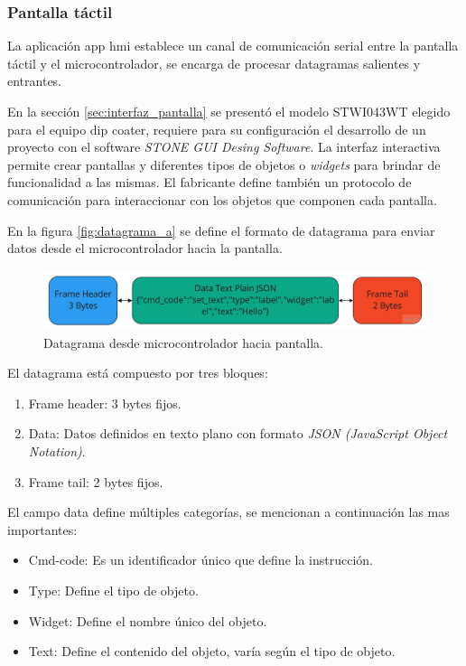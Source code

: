 \subsubsection{Pantalla táctil}

La aplicación app hmi establece un canal de comunicación serial entre la pantalla táctil y el microcontrolador, se encarga de procesar datagramas salientes y entrantes. 

En la sección \ref{sec:interfaz_pantalla} se presentó el modelo STWI043WT elegido para el equipo dip coater, requiere para su configuración el desarrollo de un proyecto con el software \textit{STONE GUI Desing Software}. La interfaz interactiva permite crear pantallas y diferentes tipos de objetos o \textit{widgets} para brindar de funcionalidad a las mismas. El fabricante define también un protocolo de comunicación \citep{web_protocolo_stone} para interaccionar con los objetos que componen cada pantalla.




En la figura \ref{fig:datagrama_a} se define el formato de datagrama para enviar datos desde el microcontrolador hacia la pantalla. 

\begin{figure}[h!]
	\centering
	\includegraphics[width=1\textwidth]{./Figures/datagrama_b.jpg}
	\caption{Datagrama desde microcontrolador hacia pantalla.}
	\label{fig:datagrama_b}
\end{figure}

El datagrama está compuesto por tres bloques:
\begin{enumerate}
\item Frame header: 3 bytes fijos.
\item Data: Datos definidos en texto plano con formato \textit{JSON (JavaScript Object Notation)}.
\item Frame tail: 2 bytes fijos.
\end{enumerate}

El campo data define múltiples categorías, se mencionan a continuación las mas importantes:
\begin{itemize}
\item Cmd-code: Es un identificador único que define la instrucción.
\item Type: Define el tipo de objeto.
\item Widget: Define el nombre único del objeto.
\item Text: Define el contenido del objeto, varía según el tipo de objeto.
\end{itemize}  

